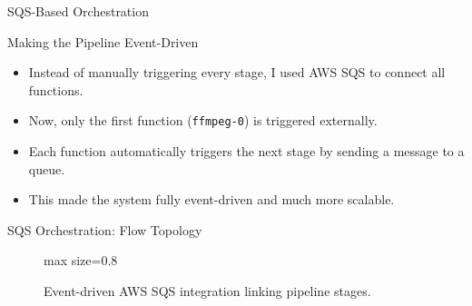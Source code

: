 \documentclass[aspectratio=169,10pt]{beamer}
\begin{document}
\begin{frame}{SQS-Based Orchestration}
    \begin{block}{Making the Pipeline Event-Driven}
        \begin{itemize}[<+->]
            \item Instead of manually triggering every stage, I used AWS SQS to connect all functions.
            \item Now, only the first function (\texttt{ffmpeg-0}) is triggered externally.
            \item Each function automatically triggers the next stage by sending a message to a queue.
            \item This made the system fully event-driven and much more scalable.
        \end{itemize}
    \end{block}
\end{frame}

\begin{frame}{SQS Orchestration: Flow Topology}
    \begin{figure}
        \centering
        \begin{adjustbox}{max size={\textwidth}{0.8\textheight}}
        \end{adjustbox}
        \caption{Event-driven AWS SQS integration linking pipeline stages.}
    \end{figure}
\end{frame}
\end{document}
